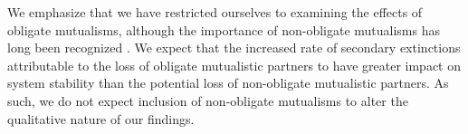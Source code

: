 \documentclass[twocolumn,preprintnumbers,amsmath,amssymb,superscriptaddress,linenumbers]{revtex4-1}
\begin{document}
\begin{bibunit}
We emphasize that we have restricted ourselves to examining the effects of obligate mutualisms, although the importance of non-obligate mutualisms has long been recognized \cite{RamosJiliberto2012,Vieira2015,Valdovinos2016,Ponisio2017,Valdovinos2019}.
We expect that the increased rate of secondary extinctions attributable to the loss of obligate mutualistic partners to have greater impact on system stability than the potential loss of non-obligate mutualistic partners.
As such, we do not expect inclusion of non-obligate mutualisms to alter the qualitative nature of our findings.\\





\end{bibunit}
\end{document}
